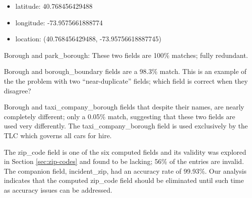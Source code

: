 \documentclass[12pt, titlepage]{article}
\begin{document}
\begin{itemize}
	\item  latitude: 40.768456429488
	
	\item  longitude: -73.9575661888774
	
	\item  location: (40.768456429488, -73.95756618887745)
\end{itemize}


\label{sec:parkborough}
Borough and park\_borough: These two fields are 100\% matches; fully redundant.


\label{sec:boroughboundaries}
Borough and borough\_boundary fields are a 98.3\% match. This 
is an example of the the problem with two ``near-duplicate'' 
fields; which field is correct when they disagree?


\label{sec:taxicompanyborough}
Borough and taxi\_company\_borough fields that despite their 
names, are nearly completely different; only a 0.05\% match, suggesting
that these two fields are used very differently. The taxi\_company\_borough
 field is used exclusively by the TLC which governs all cars for hire.
 
 

 \label{sec:zipcodes}
 The zip\_code field is one of the six computed fields and its validity 
 was explored in Section \ref{sec:zip-codes} and found to be 
 lacking; 56\% of the entries are invalid. The companion 
 field, incident\_zip, had an accuracy rate of 99.93\%. Our analysis
 indicates that the computed zip\_code field should be eliminated
 until such time as accuracy issues can be addressed. 
\end{document}
